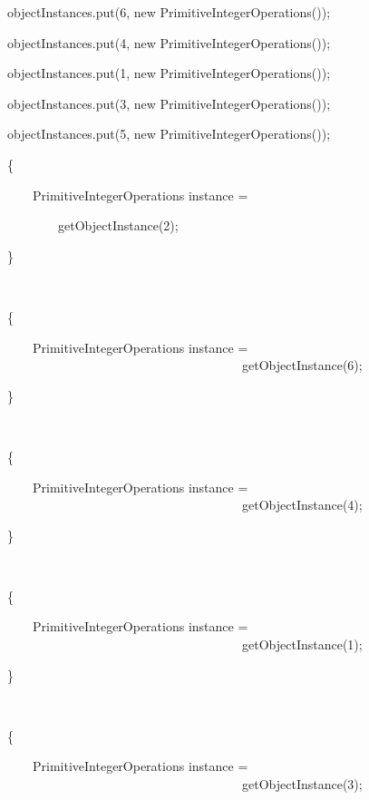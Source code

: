 \documentclass{article}
\newenvironment{tmindent}{\begin{tmparmod}{1.5em}{0pt}{0pt} }{\end{tmparmod}}
\newenvironment{tmparmod}[3]{\begin{list}{}{\setlength{\topsep}{0pt}\setlength{\leftmargin}{#1}\setlength{\rightmargin}{#2}\setlength{\parindent}{#3}\setlength{\listparindent}{\parindent}\setlength{\itemindent}{\parindent}\setlength{\parsep}{\parskip}} \item[]}{\end{list}}
\newenvironment{tmparsep}[1]{\begingroup\setlength{\parskip}{#1}}{\endgroup}
\begin{document}
\begin{example}
\begin{tmindent}
\begin{tmparsep}{0em}
      \ \ \ \ \ \ \ objectInstances.put(6, new PrimitiveIntegerOperations());
      
      \ \ \ \ \ \ \ objectInstances.put(4, new PrimitiveIntegerOperations());
      
      \ \ \ \ \ \ \ objectInstances.put(1, new PrimitiveIntegerOperations());
      
      \ \ \ \ \ \ \ objectInstances.put(3, new PrimitiveIntegerOperations());
      
      \ \ \ \ \ \ \ objectInstances.put(5, new PrimitiveIntegerOperations());
      
      \ \ \ \ \ \ \ \{
      
      \ \ \ \ \ \ \ \ \ \ \ PrimitiveIntegerOperations instance =
      
      \ \ \ \ \ \ \ \ \ \ \ \ \ \ \ getObjectInstance(2);
      
      \ \ \ \ \ \ \ \}
      
      \ \ \ \ \ \ \
      
      \ \ \ \ \ \ \ \{
      
      \ \ \ \ \ \ \ \ \ \ \ PrimitiveIntegerOperations instance = \ \ \ \ \ \
      \ \ \ \ \ \ \ \ \ \ \ \ \ \ \ \ \ \ \ \ \ \ \ \ \ \ \ \ \ \ \ \ \ \ \ \
      \ \ getObjectInstance(6);
      
      \ \ \ \ \ \ \ \}
      
      \ \ \ \ \ \ \
      
      \ \ \ \ \ \ \ \{
      
      \ \ \ \ \ \ \ \ \ \ \ PrimitiveIntegerOperations instance = \ \ \ \ \ \
      \ \ \ \ \ \ \ \ \ \ \ \ \ \ \ \ \ \ \ \ \ \ \ \ \ \ \ \ \ \ \ \ \ \ \ \
      \ \ getObjectInstance(4);
      
      \ \ \ \ \ \ \ \}
      
      \ \ \ \ \ \ \
      
      \ \ \ \ \ \ \ \{
      
      \ \ \ \ \ \ \ \ \ \ \ PrimitiveIntegerOperations instance = \ \ \ \ \ \
      \ \ \ \ \ \ \ \ \ \ \ \ \ \ \ \ \ \ \ \ \ \ \ \ \ \ \ \ \ \ \ \ \ \ \ \
      \ \ getObjectInstance(1);
      
      \ \ \ \ \ \ \ \}
      
      \ \ \ \ \ \ \
      
      \ \ \ \ \ \ \ \{
      
      \ \ \ \ \ \ \ \ \ \ \ PrimitiveIntegerOperations instance = \ \ \ \ \ \
      \ \ \ \ \ \ \ \ \ \ \ \ \ \ \ \ \ \ \ \ \ \ \ \ \ \ \ \ \ \ \ \ \ \ \ \
      \ \ getObjectInstance(3);
      

\end{tmparsep}
\end{tmindent}
\end{example}
\end{document}
